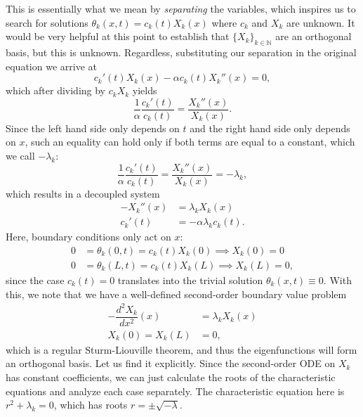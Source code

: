 This is essentially what we mean by \textit{separating} the variables, which inspires us to search for solutions $\theta_k(x,t) = c_k(t)X_k(x)$ where $c_k$ and $X_k$ are unknown. It would be very helpful at this point to establish that $\{X_k\}_{k\in\mathbb N}$ are an orthogonal basis, but this is unknown. Regardless, substituting our separation in the original equation we arrive at 
\begin{equation*}
    c_k'(t) X_k(x) - \alpha c_k(t) X_k''(x) = 0,
\end{equation*}
which after dividing by $c_k X_k$ yields
\begin{equation*}
    \frac{1}{\alpha}\frac{c_k'(t)}{c_k(t)} = \frac{X_k''(x)}{X_k(x)}.
\end{equation*}
Since the left hand side only depends on $t$ and the right hand side only depends on $x$, such an equality can hold only if both terms are equal to a constant, which we call $-\lambda_k$: 
\begin{equation*}
    \frac{1}{\alpha}\frac{c_k'(t)}{c_k(t)} = \frac{X_k''(x)}{X_k(x)} = -\lambda_k ,
\end{equation*}
which results in a decoupled system 
\begin{align*}
    -X_k''(x) &= \lambda_k X_k(x)\\
    c_k'(t) &= -\alpha\lambda_k c_k(t).
\end{align*}
Here, boundary conditions only act on $x$: 
\begin{align*}
    0 &= \theta_k(0,t) = c_k(t)X_k(0) \implies X_k(0)=0\\
    0 &= \theta_k(L,t) = c_k(t)X_k(L) \implies X_k(L)=0,
\end{align*}
since the case $c_k(t)=0$ translates into the trivial solution $\theta_k(x,t)\equiv 0$. With this, we note that we have a well-defined second-order boundary value problem 
\begin{align*}
    -\dfrac{d^2 X_k}{dx^2}(x) &= \lambda_k X_k(x)\\
    X_k(0)= X_k(L) &= 0,
\end{align*}
which is a regular Sturm-Liouville theorem, and thus the eigenfunctions will form an orthogonal basis. Let us find it explicitly. Since the second-order ODE on $X_k$ has constant coefficients, we can just calculate the roots of the characteristic equations and analyze each case separately. The characteristic equation here is $r^2+\lambda_k=0$, which has roots $r=\pm \sqrt{-\lambda}$.
